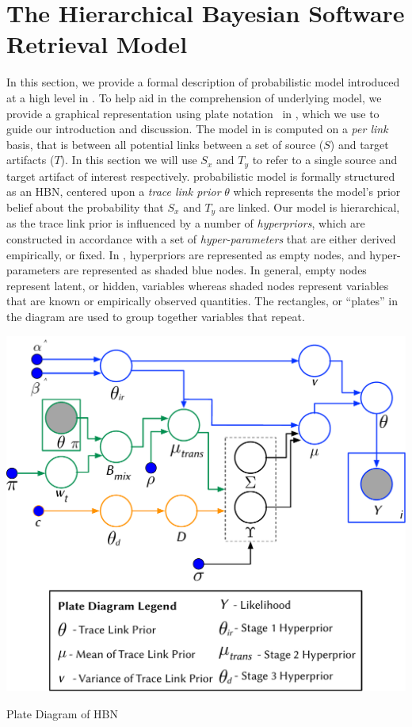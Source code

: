 \section{The Hierarchical Bayesian \hfill \break Software Retrieval Model}
\label{sec:approach-hbn}

In this section, we provide a formal description of \Comets probabilistic model introduced at a high level in  . To help aid in the comprehension of \Comets underlying model, we provide a graphical representation using plate notation~\citep{Murphy:2012} in , which we use to guide our introduction and discussion. The model in  is computed on a \textit{per link} basis, that is between all potential links between a set of source ($S$) and target artifacts ($T$). In this section we will use $S_x$ and $T_y$ to refer to a single source and target artifact of interest respectively. \Comets probabilistic model is formally structured as an HBN, centered upon a \textit{trace link prior} $\theta$ which represents the model's prior belief about the probability that $S_x$ and $T_y$ are linked.  Our model is hierarchical, as the trace link prior is influenced by a number of \textit{hyperpriors}, which are constructed in accordance with a set of \textit{hyper-parameters} that are either derived empirically, or fixed. In , hyperpriors are represented as empty nodes, and hyper-parameters are represented as shaded blue nodes. In general, empty nodes represent latent, or hidden, variables whereas shaded nodes represent variables that are known or empirically observed quantities. The rectangles, or ``plates'' in the diagram are used to group together variables that repeat.

\begin{marginfigure}%

\centering
\includegraphics[width=\columnwidth]{graphics/chap_04-bayes/fig1_Model-Plate-Diagram.pdf}
\caption{Plate Diagram of \Comets HBN}
\label{fig:model-approachI}

\end{marginfigure}

